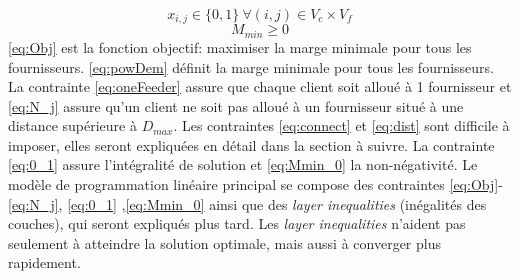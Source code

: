\documentclass[letterpaper]{article}
\begin{document}
\begin{equation}\label{eq:0_1}
x_{i,j} \in \{0,1 \} \ \forall (i,j) \in V_{c}\times V_{f}
\end{equation}
\begin{equation}\label{eq:Mmin_0}
M_{min}\geq 0
\end{equation}
\eqref{eq:Obj} est la fonction objectif: maximiser la marge minimale pour tous les fournisseurs. \eqref{eq:powDem} définit la marge minimale pour tous les fournisseurs. La contrainte \eqref{eq:oneFeeder} assure que chaque client soit alloué à 1 fournisseur et \eqref{eq:N_j} assure qu'un client ne soit pas alloué à un fournisseur situé à une distance supérieure à $D_{max}$. Les contraintes \eqref{eq:connect} et \eqref{eq:dist} sont difficile à imposer, elles seront expliquées en détail dans la section à suivre. La contrainte \eqref{eq:0_1} assure l'intégralité de solution et \eqref{eq:Mmin_0} la non-négativité.\newline \indent
Le modèle de programmation linéaire principal se compose des contraintes \eqref{eq:Obj}-\eqref{eq:N_j}, \eqref{eq:0_1} ,\eqref{eq:Mmin_0} ainsi que des \textit{layer inequalities} (inégalités des couches), qui seront expliqués plus tard. Les \textit{layer inequalities} n'aident pas seulement à atteindre la solution optimale, mais aussi à converger plus rapidement.
\end{document}

